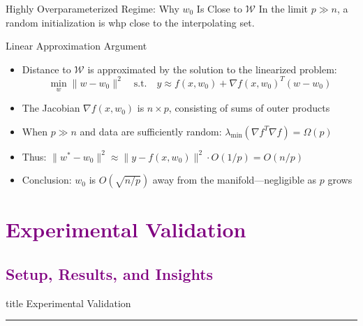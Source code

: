 \documentclass[aspectratio=169]{beamer}
\begin{document}
\begin{frame}{Highly Overparameterized Regime: Why $w_0$ Is Close to $\mathcal{W}$}
    \vspace{-0.3cm}
    In the limit $p \gg n$, a random initialization is whp close to the interpolating set.
    
    \begin{block}{Linear Approximation Argument}
        \begin{itemize}
            \item Distance to $\mathcal{W}$ is approximated by the solution to the linearized problem:
            \begin{equation}
                \min_w \|w - w_0\|^2 \quad \text{s.t.} \quad y \approx f(x, w_0) + \nabla f(x, w_0)^T(w - w_0)
            \end{equation}
            \item The Jacobian $\nabla f(x, w_0)$ is $n \times p$, consisting of sums of outer products
        \end{itemize}
    \end{block}
    
    \begin{itemize}
        \item When $p \gg n$ and data are sufficiently random: $\lambda_{\min}(\nabla f^T \nabla f) = \Omega(p)$
        \item Thus: $\|w^* - w_0\|^2 \approx \|y - f(x, w_0)\|^2 \cdot O(1/p) = O(n/p)$
        \item Conclusion: $w_0$ is $O(\sqrt{n/p})$ away from the manifold—negligible as $p$ grows
    \end{itemize}
\end{frame}

\section{\textbf{\textcolor{purple}{Experimental Validation}}}

\subsection{\textbf{\textcolor{purple}{Setup, Results, and Insights}}}
\begin{frame}[plain]
    \vfill
    \centering
    \begin{beamercolorbox}[sep=8pt,center,shadow=true,rounded=true]{title}
        Experimental Validation\par%
        \color{oxfordblue}\noindent\rule{10cm}{1pt}
    \end{beamercolorbox}
    \vfill
\end{frame}
\end{document}
